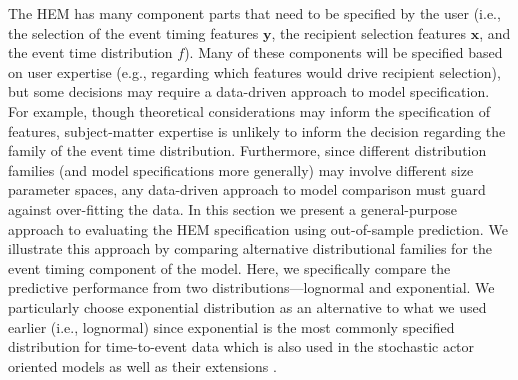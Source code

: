 \documentclass[ba]{imsart}
\numberwithin{equation}{section}
\theoremstyle{plain}
\begin{document}
	The HEM has many component parts that need to be specified by the user (i.e., the selection of the event timing features $\boldsymbol{y}$, the recipient selection features $\boldsymbol{x}$, and the event time distribution $f$). Many of these components will be specified based on user expertise (e.g., regarding which features would drive recipient selection), but some decisions may require a data-driven approach to model specification. For example, though theoretical considerations may inform the specification of features, subject-matter expertise is unlikely to inform the decision regarding the family of the event time distribution. Furthermore, since different distribution families (and model specifications more generally) may involve different size parameter spaces, any data-driven approach to model comparison must guard against over-fitting the data. In this section we present a general-purpose approach to evaluating the HEM specification using out-of-sample prediction. We illustrate this approach by comparing alternative distributional families for the event timing component of the model. Here, we specifically compare the predictive performance from two distributions---lognormal and exponential. We particularly choose exponential distribution as an alternative to what we used earlier (i.e., lognormal) since exponential is the most commonly specified distribution for time-to-event data which is also used in the stochastic actor oriented models \citep{snijders1996stochastic} as well as their extensions \citep{snijders2007modeling}. 
\end{document}
